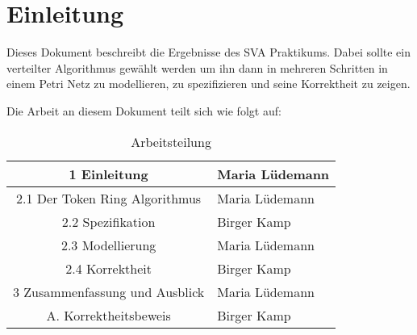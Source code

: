 \newpage
\section{Einleitung}
Dieses Dokument beschreibt die Ergebnisse des SVA Praktikums. Dabei sollte ein verteilter Algorithmus gewählt werden um ihn dann in mehreren Schritten in einem Petri Netz zu modellieren, zu spezifizieren und seine Korrektheit zu zeigen.

Die Arbeit an diesem Dokument teilt sich wie folgt auf:

\begin{table}[H]
\centering
\label{edmCats}
 \begin{tabular}{|c|l|}
 \hline
 	1 Einleitung & Maria Lüdemann\\
 \hline
	2.1 Der Token Ring Algorithmus & Maria Lüdemann\\
 \hline
	2.2 Spezifikation & Birger Kamp\\
 \hline
	2.3 Modellierung & Maria Lüdemann\\
 \hline
	2.4 Korrektheit & Birger Kamp\\
 \hline
	3 Zusammenfassung und Ausblick & Maria Lüdemann\\
 \hline
	A. Korrektheitsbeweis & Birger Kamp\\
 \hline	
 \end{tabular}
\caption{Arbeitsteilung}
\end{table}